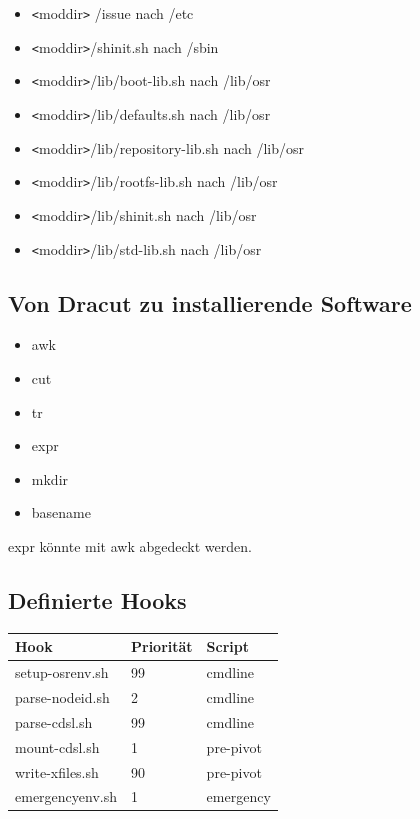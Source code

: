 \documentclass[10pt,a4paper]{article}
\begin{document}
\begin{itemize}
 \item \verb|<|moddir\verb|>| /issue nach /etc
 \item \verb|<|moddir\verb|>|/shinit.sh nach /sbin
 \item \verb|<|moddir\verb|>|/lib/boot-lib.sh nach /lib/osr
 \item \verb|<|moddir\verb|>|/lib/defaults.sh nach /lib/osr
 \item \verb|<|moddir\verb|>|/lib/repository-lib.sh nach /lib/osr
 \item \verb|<|moddir\verb|>|/lib/rootfs-lib.sh nach /lib/osr
 \item \verb|<|moddir\verb|>|/lib/shinit.sh nach /lib/osr
 \item \verb|<|moddir\verb|>|/lib/std-lib.sh nach /lib/osr
\end{itemize}

\subsection{Von Dracut zu installierende Software}

\begin{itemize}
 \item awk
 \item cut
 \item tr
 \item expr
 \item mkdir
 \item basename
\end{itemize}

expr könnte mit awk abgedeckt werden.

\subsection{Definierte Hooks}

\begin{tabular}{|l|l|l|}
 \hline
\textbf{Hook} & \textbf{Priorität} & \textbf{Script} \\ \hline
setup-osrenv.sh  & 99 & cmdline \\ \hline
parse-nodeid.sh  & 2 & cmdline \\ \hline
parse-cdsl.sh & 99 & cmdline \\ \hline
mount-cdsl.sh & 1 & pre-pivot \\ \hline
write-xfiles.sh & 90 & pre-pivot \\ \hline
emergencyenv.sh & 1 & emergency \\ \hline
\end{tabular} 
\end{document}
